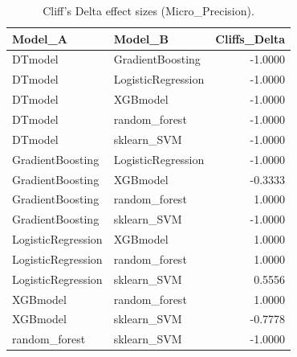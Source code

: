 \begin{table}[t]
\centering
\begin{tabular}{llr}
\toprule
Model_A & Model_B & Cliffs_Delta \\
\midrule
DTmodel & GradientBoosting & -1.0000 \\
DTmodel & LogisticRegression & -1.0000 \\
DTmodel & XGBmodel & -1.0000 \\
DTmodel & random_forest & -1.0000 \\
DTmodel & sklearn_SVM & -1.0000 \\
GradientBoosting & LogisticRegression & -1.0000 \\
GradientBoosting & XGBmodel & -0.3333 \\
GradientBoosting & random_forest & 1.0000 \\
GradientBoosting & sklearn_SVM & -1.0000 \\
LogisticRegression & XGBmodel & 1.0000 \\
LogisticRegression & random_forest & 1.0000 \\
LogisticRegression & sklearn_SVM & 0.5556 \\
XGBmodel & random_forest & 1.0000 \\
XGBmodel & sklearn_SVM & -0.7778 \\
random_forest & sklearn_SVM & -1.0000 \\
\bottomrule
\end{tabular}
\caption{Cliff's Delta effect sizes (Micro_Precision).}
\label{tab:cliffs_Micro_Precision}
\end{table}
